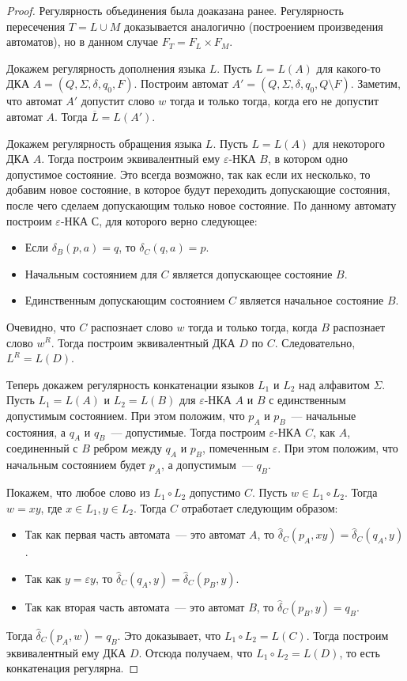 \documentclass[a4paper,12pt]{article}
\begin{document}
	\begin{proof}
		Регулярность объединения была доаказана ранее. Регулярность пересечения \(T = L \cup M\) доказывается аналогично (построением произведения автоматов), но в данном случае \(F_T = F_L \times F_M\).
		
		Докажем регулярность дополнения языка \(L\). Пусть \(L = L(A)\) для какого-то ДКА \(A = (Q, \Sigma, \delta, q_0, F)\). Построим автомат \(A' = (Q, \Sigma, \delta, q_0, Q \setminus F)\). Заметим, что автомат \(A'\) допустит слово \(w\) тогда и только тогда, когда его не допустит автомат \(A\). Тогда \(\overline{L} = L(A')\).
		
		Докажем регулярность обращения языка \(L\). Пусть \(L = L(A)\) для некоторого ДКА \(A\). Тогда построим эквивалентный ему \(\varepsilon\)-НКА \(B\), в котором одно допустимое состояние. Это всегда возможно, так как если их несколько, то добавим новое состояние, в которое будут переходить допускающие состояния, после чего сделаем допускающим только новое состояние. По данному автомату построим \(\varepsilon\)-НКА \(С\), для которого верно следующее: 
		\begin{itemize}
			\item Если \(\delta_B(p, a) = q\), то \(\delta_C(q, a) = p\).
			\item Начальным состоянием для \(C\) является допускающее состояние \(B\).
			\item Единственным допускающим состоянием \(C\) является начальное состояние \(B\).
		\end{itemize}
		Очевидно, что \(C\) распознает слово \(w\) тогда и только тогда, когда \(B\) распознает слово \(w^R\). Тогда построим эквивалентный ДКА \(D\) по \(C\). Следовательно, \(L^R = L(D)\).
		
		Теперь докажем регулярность конкатенации языков \(L_1\) и \(L_2\) над алфавитом \(\Sigma\). Пусть \(L_1 = L(A)\) и \(L_2 = L(B)\) для \(\varepsilon\)-НКА \(A\) и \(B\) с единственным допустимым состоянием. При этом положим, что \(p_A\) и \(p_B\)~--- начальные состояния, а \(q_A\) и \(q_B\)~--- допустимые. Тогда построим \(\varepsilon\)-НКА \(C\), как \(A\), соединенный с \(B\) ребром между \(q_A\) и \(p_B\), помеченным \(\varepsilon\). При этом положим, что начальным состоянием будет \(p_A\), а допустимым~--- \(q_B\). 
		
		Покажем, что любое слово из \(L_1 \circ L_2\) допустимо \(C\). Пусть \(w \in L_1 \circ L_2\). Тогда \(w = xy\), где \(x \in L_1, y \in L_2\). Тогда \(C\) отработает следующим образом:
		\begin{itemize}
			\item Так как первая часть автомата~--- это автомат \(A\), то \(\hat{\delta}_C(p_A, xy) = \hat{\delta}_C(q_A, y)\).
			\item Так как \(y = \varepsilon y\), то \(\hat{\delta}_C(q_A, y) = \hat{\delta}_C(p_B, y)\).
			\item Так как вторая часть автомата~--- это автомат \(B\), то \(\hat{\delta}_C(p_B, y) = q_B\).
		\end{itemize}
		Тогда \(\hat{\delta}_C(p_A, w)= q_B\). Это доказывает, что \(L_1 \circ L_2 = L(C)\). Тогда построим эквивалентный ему ДКА \(D\). Отсюда получаем, что \(L_1 \circ L_2 = L(D)\), то есть конкатенация регулярна.
		

\end{proof}
\end{document}
